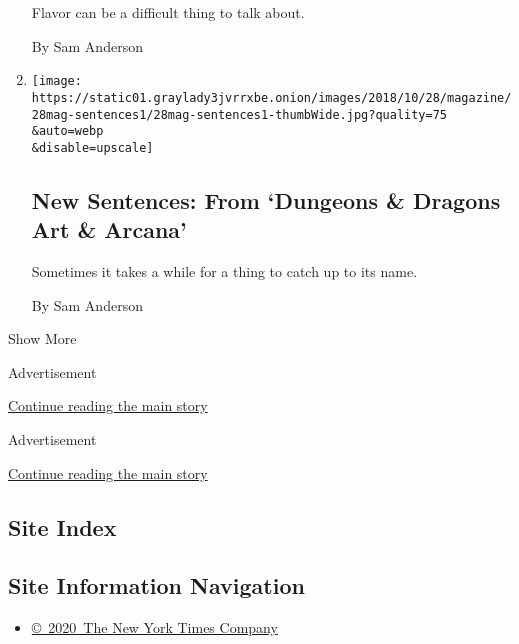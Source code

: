 \begin{enumerate}
  Flavor can be a difficult thing to talk about.

  By Sam Anderson
\item
  \href{/2018/10/26/magazine/new-sentences-from-dungeons-dragons-art-arcana.html}{}

  \texttt{[image: https://static01.graylady3jvrrxbe.onion/images/2018/10/28/magazine/28mag-sentences1/28mag-sentences1-thumbWide.jpg?quality=75\\\&auto=webp\\\&disable=upscale]}

  \hypertarget{new-sentences-from-dungeons--dragons-art--arcana}{%
  \subsection{New Sentences: From `Dungeons \& Dragons Art \&
  Arcana'}\label{new-sentences-from-dungeons--dragons-art--arcana}}

  Sometimes it takes a while for a thing to catch up to its name.

  By Sam Anderson
\end{enumerate}

Show More

Advertisement

\protect\hyperlink{after-mid1}{Continue reading the main story}

Advertisement

\protect\hyperlink{after-mktg}{Continue reading the main story}

\hypertarget{site-index}{%
\subsection{Site Index}\label{site-index}}

\hypertarget{site-information-navigation}{%
\subsection{Site Information
Navigation}\label{site-information-navigation}}

\begin{itemize}
\tightlist
\item
  \href{https://help.nytimes3xbfgragh.onion/hc/en-us/articles/115014792127-Copyright-notice}{©~2020~The
  New York Times Company}
\end{itemize}

